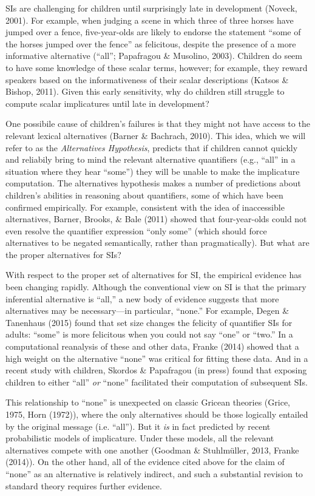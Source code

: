 \documentclass[10pt, letterpaper]{article}
\begin{document}
SIs are challenging for children until surprisingly late in development
(Noveck, 2001). For example, when judging a scene in which three of
three horses have jumped over a fence, five-year-olds are likely to
endorse the statement ``some of the horses jumped over the fence'' as
felicitous, despite the presence of a more informative alternative
(``all''; Papafragou \& Musolino, 2003). Children do seem to have some
knowledge of these scalar terms, however; for example, they reward
speakers based on the informativeness of their scalar descriptions
(Katsos \& Bishop, 2011). Given this early sensitivity, why do children
still struggle to compute scalar implicatures until late in development?

One possibile cause of children's failures is that they might not have
access to the relevant lexical alternatives (Barner \& Bachrach, 2010).
This idea, which we will refer to as the \emph{Alternatives Hypothesis},
predicts that if children cannot quickly and reliabily bring to mind the
relevant alternative quantifiers (e.g., ``all'' in a situation where
they hear ``some'') they will be unable to make the implicature
computation. The alternatives hypothesis makes a number of predictions
about children's abilities in reasoning about quantifiers, some of which
have been confirmed empirically. For example, consistent with the idea
of inaccessible alternatives, Barner, Brooks, \& Bale (2011) showed that
four-year-olds could not even resolve the quantifier expression ``only
some'' (which should force alternatives to be negated semantically,
rather than pragmatically). But what are the proper alternatives for
SIs?

With respect to the proper set of alternatives for SI, the empirical
evidence has been changing rapidly. Although the conventional view on SI
is that the primary inferential alternative is ``all,'' a new body of
evidence suggests that more alternatives may be necessary---in
particular, ``none.'' For example, Degen \& Tanenhaus (2015) found that
set size changes the felicity of quantifier SIs for adults: ``some'' is
more felicitous when you could not say ``one'' or ``two.'' In a
computational reanalysis of these and other data, Franke (2014) showed
that a high weight on the alternative ``none'' was critical for fitting
these data. And in a recent study with children, Skordos \& Papafragou
(in press) found that exposing children to either ``all'' \emph{or}
``none'' facilitated their computation of subsequent SIs.

This relationship to ``none'' is unexpected on classic Gricean theories
(Grice, 1975, Horn (1972)), where the only alternatives should be those
logically entailed by the original message (i.e. ``all''). But it
\emph{is} in fact predicted by recent probabilistic models of
implicature. Under these models, all the relevant alternatives compete
with one another (Goodman \& Stuhlm{ü}ller, 2013, Franke (2014)). On the
other hand, all of the evidence cited above for the claim of ``none'' as
an alternative is relatively indirect, and such a substantial revision
to standard theory requires further evidence.
\end{document}
